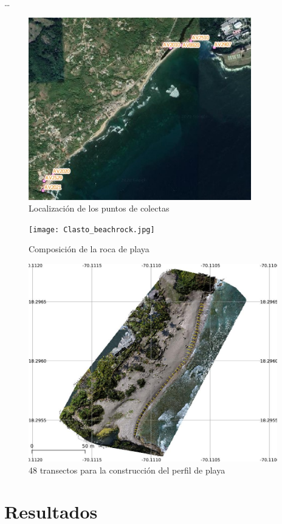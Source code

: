 \documentclass[11pt,]{article}
\begin{document}
\ldots

\begin{figure}
\centering
\includegraphics[height=3.12500in]{areas_muestras_colectadas.jpg}
\caption{Localización de los puntos de colectas\label{muestras}}
\end{figure}

\begin{figure}
\centering
\texttt{[image: Clasto\_beachrock.jpg]}
\caption{Composición de la roca de playa\label{clasto}}
\end{figure}

\begin{figure}
\centering
\includegraphics[height=3.38542in]{costa_transecto.jpg}
\caption{48 transectos para la construcción del perfil de
playa\label{carlo}}
\end{figure}

\section{Resultados}\label{resultados}
\end{document}
